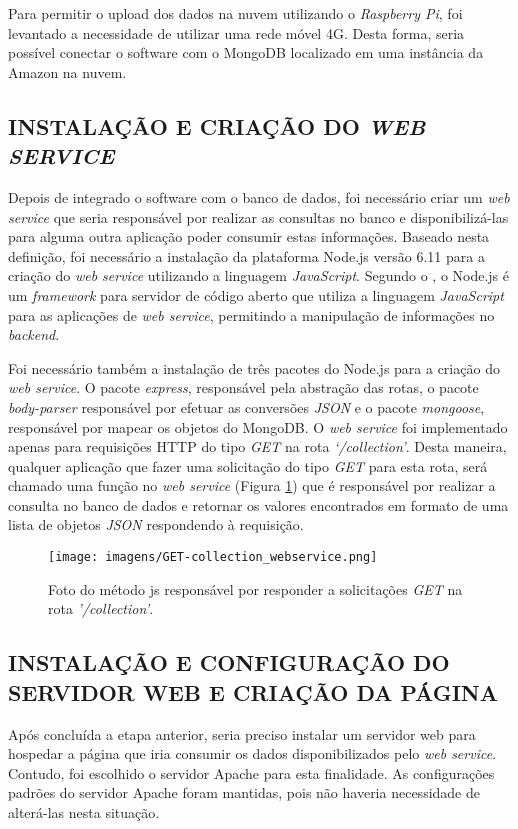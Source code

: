 Para permitir o upload dos dados na nuvem utilizando o \textit{Raspberry Pi}, foi levantado a necessidade de utilizar uma rede móvel 4G. Desta forma, seria possível conectar o software com o MongoDB localizado em uma instância da Amazon na nuvem.

\subsection{INSTALAÇÃO E CRIAÇÃO DO \textit{WEB SERVICE}}
Depois de integrado o software com o banco de dados, foi necessário criar um \textit{web service} que seria responsável por realizar as consultas no banco e disponibilizá-las para alguma outra aplicação poder consumir estas informações. Baseado nesta definição, foi necessário a instalação da plataforma Node.js versão 6.11 para a criação do \textit{web service} utilizando a linguagem \textit{JavaScript}. Segundo o , o Node.js é um \textit{framework} para servidor de código aberto que utiliza a linguagem \textit{JavaScript} para as aplicações de \textit{web service}, permitindo a manipulação de informações no \textit{backend}.

Foi necessário também a instalação de três pacotes do Node.js para a criação do \textit{web service}. O pacote \textit{express}, responsável pela abstração das rotas, o pacote \textit{body-parser} responsável por efetuar as conversões \textit{JSON} e o pacote \textit{mongoose}, responsável por mapear os objetos do MongoDB. O \textit{web service} foi implementado apenas para requisições HTTP do tipo \textit{GET} na rota \textit{‘/collection’}. Desta maneira, qualquer aplicação que fazer uma solicitação do tipo \textit{GET} para esta rota, será chamado uma função no \textit{web service} (Figura \ref{Fig:get_collection}) que é responsável por realizar a consulta no banco de dados e retornar os valores encontrados em formato de uma lista de objetos \textit{JSON} respondendo à requisição.

\begin{figure}[!ht]
\centering
\caption{Foto do método js responsável por responder a solicitações \textit{GET} na rota \textit{'/collection'}.} 
{\texttt{[image: imagens/GET-collection\_webservice.png]}}\\
 \label{Fig:get_collection}
\end{figure}

\subsection{INSTALAÇÃO E CONFIGURAÇÃO DO SERVIDOR WEB E CRIAÇÃO DA PÁGINA}
Após concluída a etapa anterior, seria preciso instalar um servidor web para hospedar a página que iria consumir os dados disponibilizados pelo \textit{web service}. Contudo, foi escolhido o servidor Apache para esta finalidade. As configurações padrões do servidor Apache foram mantidas, pois não haveria necessidade de alterá-las nesta situação.

